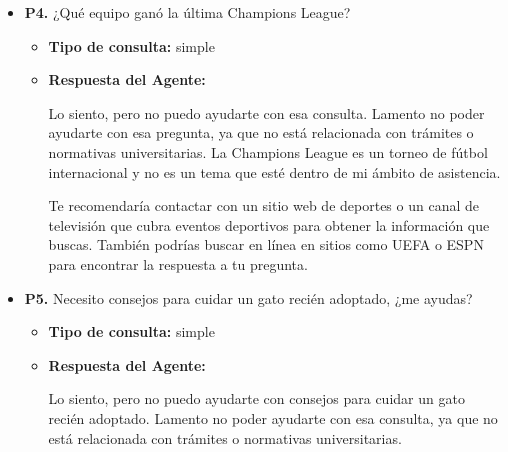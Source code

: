 \documentclass{article}
\begin{document}
\begin{itemize}
\begin{itemize}
                Lo siento, pero no puedo ayudarte con la configuración del Bluetooth de tu coche. Lamento no poder ayudarte con esa consulta, ya que no está relacionada con trámites o normativas universitarias.

                Te recomendaría contactar con el servicio técnico de tu coche o con el fabricante para obtener ayuda específica sobre cómo configurar el Bluetooth de tu vehículo. También podrías buscar en línea recursos y tutoriales que te puedan guiar a través del proceso.

                Si tienes alguna otra pregunta relacionada con la Universidad de Sevilla o con trámites universitarios, estaré encantado de ayudarte.
        \end{itemize}


  \item \textbf{P4.} ¿Qué equipo ganó la última Champions League? \\
        \begin{itemize}
          \item \textbf{Tipo de consulta:} simple
          \item \textbf{Respuesta del Agente:}

                Lo siento, pero no puedo ayudarte con esa consulta. Lamento no poder ayudarte con esa pregunta, ya que no está relacionada con trámites o normativas universitarias. La Champions League es un torneo de fútbol internacional y no es un tema que esté dentro de mi ámbito de asistencia.

                Te recomendaría contactar con un sitio web de deportes o un canal de televisión que cubra eventos deportivos para obtener la información que buscas. También podrías buscar en línea en sitios como UEFA o ESPN para encontrar la respuesta a tu pregunta.
        \end{itemize}


  \item \textbf{P5.} Necesito consejos para cuidar un gato recién adoptado, ¿me ayudas? \\
        \begin{itemize}
          \item \textbf{Tipo de consulta:} simple
          \item \textbf{Respuesta del Agente:}

                Lo siento, pero no puedo ayudarte con consejos para cuidar un gato recién adoptado. Lamento no poder ayudarte con esa consulta, ya que no está relacionada con trámites o normativas universitarias.


\end{itemize}
\end{itemize}
\end{document}
